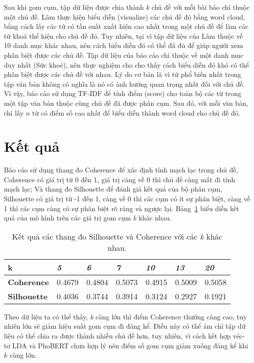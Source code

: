 Sau khi gom cụm, tập dữ liệu được chia thành \textit{k} chủ đề với mỗi bài báo
chỉ thuộc một chủ đề. Lâm \cite{lamGomCumVan2021} thực hiện biểu diễn
(visualize) các chủ đề đó bằng word cloud, bằng cách lấy các từ có tần suất
xuất hiện cao nhất trong một chủ đề để làm các từ khoá thể hiện cho chủ đề đó.
Tuy nhiên, tại vì tập dữ liệu của Lâm \cite{lamGomCumVan2021} thuộc về 10 danh
mục khác nhau, nên cách biểu diễn đó có thể đã đủ để giúp người xem phân biệt
được các chủ đề. Tập dữ liệu của báo cáo chỉ thuộc về một danh mục duy nhất
(Sức khoẻ), nên thực nghiệm cho cho thấy cách biểu diễn đó khó có thể phân biệt
được các chủ đề với nhau. Lý do cơ bản là vì từ phổ biến nhất trong tập văn bản
không có nghĩa là nó có ảnh hưởng quan trọng nhất đối với chủ đề. Vì vậy, báo
cáo sử dụng TF-IDF để tính điểm (score) cho toàn bộ các từ trong một tập văn
bản thuộc cùng chủ đề đã được phân cụm. Sau đó, với mỗi văn bản, chỉ lấy $n$ từ
có điểm số cao nhất để biểu diễn thành word cloud cho chủ đề đó.

\section{Kết quả}
Báo cáo sử dụng thang đo Coherence để xác định tính mạch lạc trong chủ đề,
Coherence có giá trị từ 0 đến 1, giá trị càng về 0 thì chủ đề càng mất đi tính
mạch lạc; Và thang đo Silhouette để đánh giá kết quả của bộ phân cụm,
Silhouette có giá trị từ -1 đến 1, càng về 0 thì các cụm có ít sự phân biệt,
càng về 1 thì các cụm càng có sự phân biệt rõ ràng và ngược lại.
Bảng~\ref{table:result} biểu diễn kết quả của mô hình trên các giá trị gom cụm
\textit{k} khác nhau.

\begin{table}[ht!]
    \centering
    \begin{tabular}{lllllll}
        \textbf{k}          & \textit{5} & \textit{6} & \textit{7} & \textit{10} & \textit{13} & \textit{20} \\ \hline
        \textbf{Coherence}  & 0.4679     & 0.4804     & 0.5073     & 0.4915      & 0.5009      & 0.5058      \\
        \textbf{Silhouette} & 0.4036     & 0.3744     & 0.3914     & 0.3124      & 0.2927      & 0.1921     
    \end{tabular}
    \caption{Kết quả các thang đo Silhouette và Coherence với các \textit{k}
    khác nhau.}
    \label{table:result}
\end{table}

Theo dữ liệu ta có thể thấy, \textit{k} càng lớn thì điểm Coherence thường càng
cao, tuy nhiên  lớn sẽ giảm hiệu suất gom cụm đi đáng kể. Điều này có
thể ám chỉ tập dữ liệu có thể chia ra được thành nhiều chủ đề hơn, tuy nhiên,
vì cách kết hợp véc-tơ LDA và PhoBERT chưa hợp lý nên điểm số gom cụm giảm
xuống đáng kể khi $k$ càng lớn.

